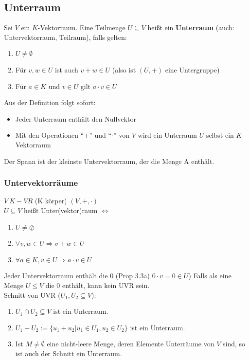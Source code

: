\documentclass{scrartcl}
\newcommand{\schnitt}{\cap}
\begin{document}
\subsection{Unterraum}
\label{Untervektorraum}

\begin{Def}

Sei $V$ ein $K$-Vektorraum. Eine Teilmenge $U \subseteq V$ heißt ein \textbf{Unterraum} (auch: Untervektorraum, Teilraum), falls gelten:
\begin{enumerate}[label={(\arabic*)}]
\item $U \neq \emptyset$
\item Für $v,w \in U$ ist auch $v + w \in U$ (also ist $(U, +)$ eine Untergruppe)
\item Für $a \in K$ und $v \in U$ gilt $a \cdot v \in U$
\end{enumerate}
Aus der Definition folgt sofort:
\begin{itemize}
\item Jeder Unterraum enthält den Nullvektor
\item Mit den Operationen ``$+$'' und ``$\cdot$'' von $V$ wird ein Unterraum $U$ selbst ein $K$-Vektorraum
\end{itemize}
\end{Def}
\begin{Notiz}
Der \label{Spann} Spann ist der kleinste Untervektorraum, der die Menge A enthält.
\end{Notiz}

\subsubsection{Untervektorräume}
\begin{Def}
	$V~K-VR$ (K körper) $(V,+,\cdot)$ \\
	$U \subseteq V$ heißt Unter(vektor)raum $\Leftrightarrow$
	\begin{enumerate}[label={(\arabic*)}]
		\item %
		$U \neq \oslash$
		
		\item %
		$\forall v,w \in U \Rightarrow v + w \in U$ 
		
		\item %
		$\forall a \in K, v \in U \Rightarrow a \cdot v \in U$
	\end{enumerate}


	Jeder Untervektorraum  enthält die 0 (Prop 3.3a) $0 \cdot v = 0 \in U$) Falls als eine Menge $U \leq V$ die 0 enthält, kann kein UVR sein.\\
	Schnitt von UVR ($U_1, U_2 \subseteq V$):
	\begin{enumerate}
	\item $U_1 \schnitt U_2 \subseteq V$ ist ein Unterraum.
	\item $U_1 + U_2 := \{u_1 + u_2 | u_1 \in U_1, u_2 \in U_2\}$ ist ein Unterraum.
	\item Ist $M \neq \emptyset$ eine nicht-leere Menge, deren Elemente Unterräume von $V$ sind, so ist auch der Schnitt ein Unterraum.
	\end{enumerate}
\end{Def}
	
\end{document}
